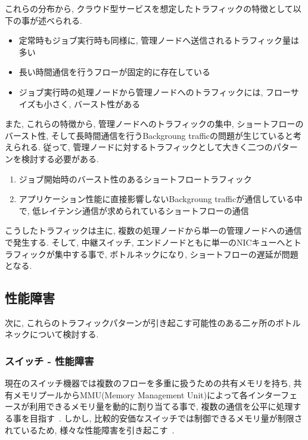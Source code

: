 \documentclass[11pt, a4paper, uplatex]{jsarticle}
\begin{document}
これらの分布から, クラウド型サービスを想定したトラフィックの特徴として以下の事が述べられる.
\begin{itemize}
  \item 定常時もジョブ実行時も同様に, 管理ノードへ送信されるトラフィック量は多い
  \item 長い時間通信を行うフローが固定的に存在している
  \item ジョブ実行時の処理ノードから管理ノードへのトラフィックには, フローサイズも小さく, バースト性がある
\end{itemize}

また, これらの特徴から, 管理ノードへのトラフィックの集中, ショートフローのバースト性,
そして長時間通信を行うBackgroung trafficの問題が生じていると考えられる.
従って, 管理ノードに対するトラフィックとして大きく二つのパターンを検討する必要がある.
\begin{enumerate}
  \item ジョブ開始時のバースト性のあるショートフロートラフィック
  \item アプリケーション性能に直接影響しないBackgroung trafficが通信している中で,
  低レイテンシ通信が求められているショートフローの通信
\end{enumerate}

こうしたトラフィックは主に, 複数の処理ノードから単一の管理ノードへの通信で発生する.
そして, 中継スイッチ, エンドノードともに単一のNICキューへとトラフィックが集中する事で, ボトルネックになり,
ショートフローの遅延が問題となる\cite{bottleneck}.

\subsection{性能障害}
\label{sec:expected_effect}
次に, これらのトラフィックパターンが引き起こす可能性のある二ヶ所のボトルネックについて検討する.

\subsubsection{スイッチ - 性能障害}
現在のスイッチ機器では複数のフローを多重に扱うための共有メモリを持ち, 共有メモリプールからMMU(Memory Management
Unit)によって各インターフェースが利用できるメモリ量を動的に割り当てる事で, 複数の通信を公平に処理する事を目指す~\cite{flexible}.
しかし, 比較的安価なスイッチでは制御できるメモリ量が制限されているため,
様々な性能障害を引き起こす~\cite{flexible}.
\end{document}
